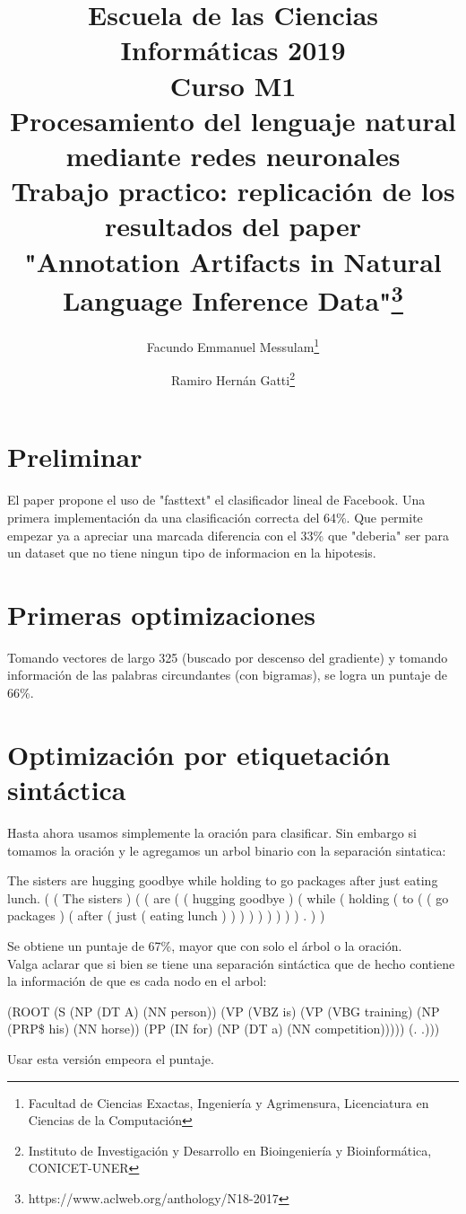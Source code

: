 \documentclass{article}
\title{Escuela de las Ciencias Informáticas 2019\\
	{\small{Curso M1}}\\
	Procesamiento del lenguaje natural mediante redes neuronales\\
	{\small{Trabajo practico: replicación de los resultados del paper}}\\
	"Annotation Artifacts in Natural Language Inference Data"\footnote{https://www.aclweb.org/anthology/N18-2017}}
\author{Facundo Emmanuel Messulam\footnote{Facultad de Ciencias Exactas, Ingeniería y Agrimensura, Licenciatura en Ciencias de la Computación}
	\and
	Ramiro Hernán Gatti\footnote{Instituto de Investigación y Desarrollo en Bioingeniería y Bioinformática, CONICET-UNER}}
\begin{document}
    \begin{titlepage}
        \maketitle
        \thispagestyle{empty}
    \end{titlepage}
	
	\section*{Preliminar}
	El paper propone el uso de "fasttext" el clasificador lineal de Facebook\cite{joulin2017bag}. Una primera implementación da una clasificación correcta del 64\%. Que permite empezar ya a apreciar una marcada diferencia con el 33\% que "deberia" ser para un dataset que no tiene ningun tipo de informacion en la hipotesis.
	
	\section*{Primeras optimizaciones}
	Tomando vectores de largo 325 (buscado por descenso del gradiente) y tomando información de las palabras circundantes (con bigramas\cite{bigrams}), se logra un puntaje de 66\%.
	
	\section*{Optimización por etiquetación sintáctica}
	Hasta ahora usamos simplemente la oración para clasificar. Sin embargo si tomamos la oración y le agregamos un arbol binario con la separación sintatica:
	\begin{spverbatim}
		The sisters are hugging goodbye while holding to go packages after just eating lunch. ( ( The sisters ) ( ( are ( ( hugging goodbye ) ( while ( holding ( to ( ( go packages ) ( after ( just ( eating lunch ) ) ) ) ) ) ) ) ) . ) )
	\end{spverbatim}
	\medskip
	Se obtiene un puntaje de 67\%, mayor que con solo el árbol o la oración.\\
	Valga aclarar que si bien se tiene una separación sintáctica que de hecho contiene la información de que es cada nodo en el arbol:
	\begin{spverbatim}
		(ROOT (S (NP (DT A) (NN person)) (VP (VBZ is) (VP (VBG training) (NP (PRP\$ his) (NN horse)) (PP (IN for) (NP (DT a) (NN competition))))) (. .)))
	\end{spverbatim}
	\medskip
	Usar esta versión empeora el puntaje.
	
\end{document}
